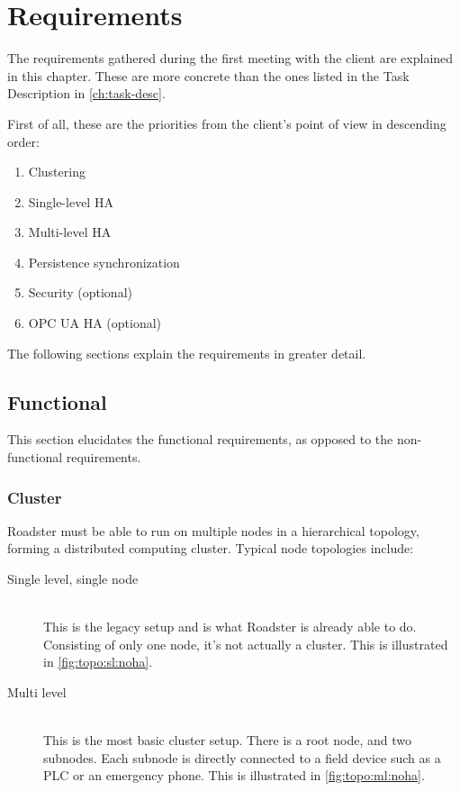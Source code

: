 \chapter{Requirements}
The requirements gathered during the first meeting with the client are
explained in this chapter. These are more concrete than the ones listed in the
Task Description in \autoref{ch:task-desc}.

First of all, these are the priorities from the client's point of view in
descending order:

\begin{enumerate}
\item Clustering
\item Single-level \gls{HA}
\item Multi-level \gls{HA}
\item Persistence synchronization
\item Security (optional)
\item OPC UA \gls{HA} (optional)
\end{enumerate}

The following sections explain the requirements in greater detail.

\section{Functional}
This section elucidates the functional requirements, as opposed to the
non-functional requirements.

\subsection{Cluster}
Roadster must be able to run on multiple nodes in a hierarchical topology,
forming a distributed computing cluster. Typical node topologies include:

\begin{description}
	\item [ Single level, single node ] \hfill\\
		This is the legacy setup and is what Roadster is already able
		to do. Consisting of only one node, it's not actually a
		cluster. This is illustrated in \autoref{fig:topo:sl:noha}.

	\item [ Multi level ] \hfill\\
		This is the most basic cluster setup. There is a root node, and
		two subnodes. Each subnode is directly connected to a field device such as a
		PLC or an emergency phone. This is illustrated in
		\autoref{fig:topo:ml:noha}.
\end{description}

